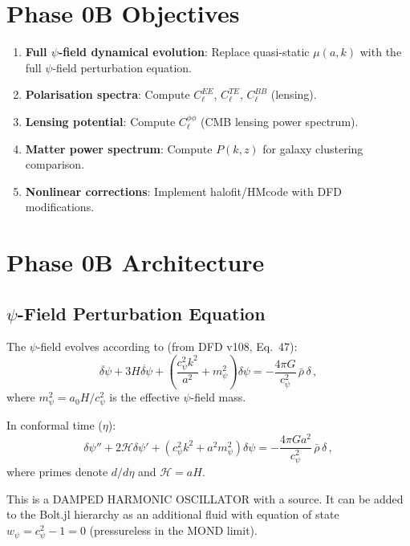 \documentclass[11pt,a4paper]{article}
\begin{document}
\section{Phase 0B Objectives}

\begin{enumerate}
\item \textbf{Full $\psi$-field dynamical evolution}: Replace quasi-static $\mu(a,k)$ with the full $\psi$-field perturbation equation.
\item \textbf{Polarisation spectra}: Compute $C_\ell^{EE}$, $C_\ell^{TE}$, $C_\ell^{BB}$ (lensing).
\item \textbf{Lensing potential}: Compute $C_\ell^{\phi\phi}$ (CMB lensing power spectrum).
\item \textbf{Matter power spectrum}: Compute $P(k,z)$ for galaxy clustering comparison.
\item \textbf{Nonlinear corrections}: Implement halofit/HMcode with DFD modifications.
\end{enumerate}

\section{Phase 0B Architecture}

\subsection{$\psi$-Field Perturbation Equation}

The $\psi$-field evolves according to (from DFD v108, Eq.~47):
\begin{equation}
\ddot{\delta\psi} + 3H\dot{\delta\psi} + \left(\frac{c_\psi^2 k^2}{a^2} + m_\psi^2\right)\delta\psi = -\frac{4\pi G}{c_\psi^2}\,\bar{\rho}\,\delta\,,
\end{equation}
where $m_\psi^2 = a_0 H / c_\psi^2$ is the effective $\psi$-field mass.

In conformal time ($\eta$):
\begin{equation}
\delta\psi'' + 2\mathcal{H}\delta\psi' + (c_\psi^2 k^2 + a^2 m_\psi^2)\delta\psi = -\frac{4\pi G a^2}{c_\psi^2}\,\bar{\rho}\,\delta\,,
\end{equation}
where primes denote $d/d\eta$ and $\mathcal{H} = aH$.

This is a DAMPED HARMONIC OSCILLATOR with a source. It can be added to the Bolt.jl hierarchy as an additional fluid with equation of state $w_\psi = c_\psi^2 - 1 = 0$ (pressureless in the MOND limit).
\end{document}
